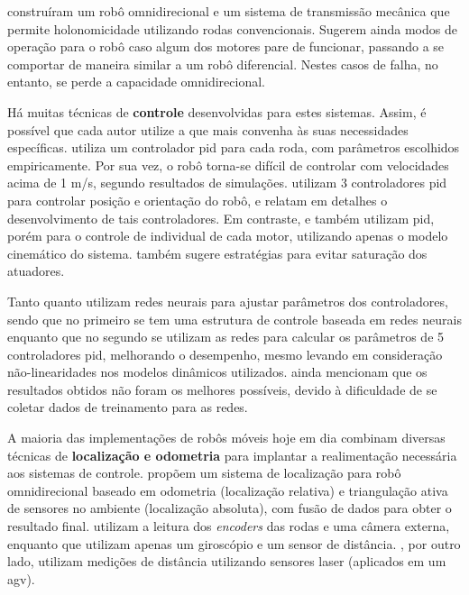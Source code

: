 \citet{jung2001fault} construíram um robô omnidirecional e um sistema de transmissão mecânica que permite holonomicidade utilizando rodas convencionais. Sugerem ainda modos de operação para o robô caso algum dos motores pare de funcionar, passando a se comportar de maneira similar a um robô diferencial. Nestes casos de falha, no entanto, se perde a capacidade omnidirecional.

Há muitas técnicas de \textbf{controle} desenvolvidas para estes sistemas. Assim, é possível que cada autor utilize a que mais convenha às suas necessidades específicas. \citet{ritter2016modelagem} utiliza um controlador \acrshort{pid} para cada roda, com parâmetros escolhidos empiricamente. Por sua vez, o robô torna-se difícil de controlar com velocidades acima de 1 m/s, segundo resultados de simulações. \citet{samani2007comprehensive} utilizam 3 controladores \acrshort{pid} para controlar posição e orientação do robô, e relatam em detalhes o desenvolvimento de tais controladores. Em contraste, \citet{rojas2006holonomic} e \citet{indiveri2009swedish} também utilizam \acrshort{pid}, porém para o controle de individual de cada motor, utilizando apenas o modelo cinemático do sistema. \citet{indiveri2009swedish} também sugere estratégias para evitar saturação dos atuadores.

Tanto \citet{treesatayapun2011discrete} quanto \citet{oubbati2005velocity} utilizam redes neurais para ajustar parâmetros dos controladores, sendo que no primeiro se tem uma estrutura de controle baseada em redes neurais enquanto que no segundo se utilizam as redes para calcular os parâmetros de 5 controladores \acrshort{pid}, melhorando o desempenho, mesmo levando em consideração não-linearidades nos modelos dinâmicos utilizados. \citet{oubbati2005velocity} ainda mencionam que os resultados obtidos não foram os melhores possíveis, devido à dificuldade de se coletar dados de treinamento para as redes.

A maioria das implementações de robôs móveis hoje em dia combinam diversas técnicas de \textbf{localização e odometria} para implantar a realimentação necessária aos sistemas de controle. \citet{ginzburg2013indoor} propõem um sistema de localização para robô omnidirecional baseado em odometria (localização relativa) e triangulação ativa de sensores no ambiente (localização absoluta), com fusão de dados para obter o resultado final. \citet{rojas2006holonomic} utilizam a leitura dos \emph{encoders} das rodas e uma câmera externa, enquanto que \citet{garcia2015gyro} utilizam apenas um giroscópio e um sensor de distância. \citet{rohrig2010laser}, por outro lado, utilizam medições de distância utilizando sensores laser (aplicados em um \acrshort{agv}).

